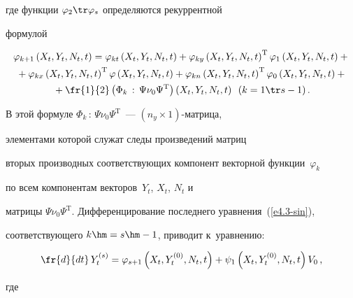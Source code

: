 где функции  $\varphi_2\tr \varphi_s$ определяются рекуррентной


формулой





\noindent


\begin{multline*}


\varphi_{k+1} \yxnt =


\varphi_{kt}\yxnt + \varphi_{ky}\yxnt^{\mathrm{T}} \varphi_{1}\yxnt+{}\\


{}+\varphi_{kx}\yxnt^{\mathrm{T}} \varphi\yxnt+\varphi_{kn}\yxnt^{\mathrm{T}}


 \varphi_{0}\yxnt+{}\\


{}+\fr{1}{2} \left(\Phi_k\,:\, \Psi\nu_0\Psi^{\mathrm{T}}\right)\yxnt \enskip 


(k=1\tr s-1)\,. %


\end{multline*}


В этой формуле $\Phi_k\,:\, \Psi\nu_0\Psi^{\mathrm{T}}$~--- $(n_y\times1)$-мат\-ри\-ца, 


элементами которой служат следы произведений матриц


вторых производных соответствующих компонент векторной функции~$\varphi_k$ 


по всем компонентам векторов~$Y_t$, $X_t$, $N_t$ и


матрицы $\Psi\nu_0\Psi^{\mathrm{T}}$. Дифференцирование последнего уравнения~(\ref{e4.3-sin}), 


соответствующего  $k\hm=s\hm-1$, приводит к~уравнению:


\begin{equation}


\fr{d}{dt}\, Y_t^{(s)} = \varphi_{s+1} \left(X_t,Y_t^{(0)}, N_t,t\right) + 


\psi_1 \left(X_t,Y_t^{(0)}, N_t,t\right)V_0\,,\label{e4.5-sin}


\end{equation}


где





\vspace*{-2pt}





\noindent


